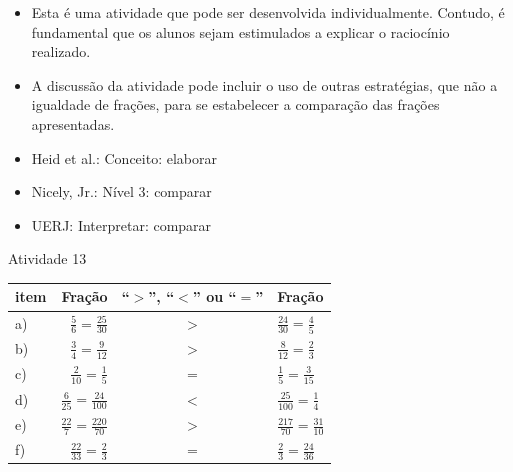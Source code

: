 \begin{multicols}{2}

\begin{itemize} %
    \item       Esta é uma atividade que pode ser desenvolvida individualmente.
Contudo, é fundamental que os alunos sejam estimulados a explicar o raciocínio
realizado.
    \item       A discussão da atividade pode incluir o uso de outras
estratégias, que não a igualdade de frações, para se estabelecer a comparação
das frações apresentadas.
\end{itemize} %


   \vspace{.1cm}

 \vspace{.1cm}

\begin{itemize} %
    \item       Heid et al.: Conceito: elaborar
    \item       Nicely, Jr.: Nível 3: comparar
    \item       UERJ: Interpretar: comparar
\end{itemize} %

\begin{resposta*}{Atividade 13}

\noindent
    \begin{tabular}{lrcl}

       item &  Fração &  ``$>$'', ``$<$'' ou ``$=$'' &  Fração \\
      \hline
       a) &  $\frac{5}{6} = \frac{25}{30}$ &   $>$  &  $\frac{24}{30} =
\frac{4}{5}$ \\

       b) &  $\frac{3}{4} = \frac{9}{12}$ &   $>$  &  $\frac{8}{12} =
\frac{2}{3}$ \\

       c) &  $\frac{2}{10} = \frac{1}{5}$ &   $=$  &  $\frac{1}{5} =
\frac{3}{15}$ \\

       d) &  $\frac{6}{25} = \frac{24}{100}$ &   $<$  &  $\frac{25}{100} =
\frac{1}{4}$ \\

       e) &  $\frac{22}{7} = \frac{220}{70}$ &   $>$  &  $\frac{217}{70} =
\frac{31}{10}$ \\

       f) &  $\frac{22}{33} = \frac{2}{3}$ &   $=$  &  $\frac{2}{3} =
\frac{24}{36}$ \\


\end{tabular}
\end{resposta*}
\end{multicols}
